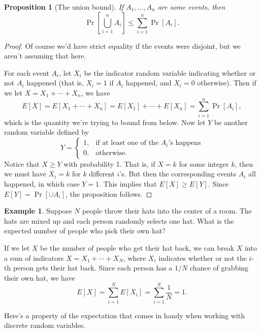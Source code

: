 \documentclass[12pt]{article}
\theoremstyle{plain}
\newtheorem{proposition}[theorem]{Proposition}
\theoremstyle{definition}
\newtheorem{example}[theorem]{Example}
\theoremstyle{remark}
\begin{document}
\begin{proposition}[The union bound]
    If $A_1, \ldots, A_n$ are some events, then
    \[
        \Pr\left[\bigcup_{i=1}^nA_i\right] \leq \sum_{i=1}^n\Pr[A_i].
    \]
\end{proposition}
\begin{proof}
    Of course we'd have strict equality if the events were disjoint, but we aren't assuming that here.

    For each event $A_i$, let $X_i$ be the indicator random variable indicating whether or not $A_i$ happened (that is, $X_i = 1$ if $A_i$ happened, and $X_i = 0$ otherwise).
    Then if we let $X = X_1 + \cdots + X_n$, we have
    \[
        E[X] = E[X_1 + \cdots + X_n] = E[X_1] + \cdots + E[X_n] = \sum_{i=1}^n \Pr[A_i],
    \]
    which is the quantity we're trying to bound from below.
    Now let $Y$ be another random variable defined by
    \[
        Y = \begin{cases}
            1,&\text{if at least one of the $A_i$'s happens}\\
            0,&\text{otherwise.}
        \end{cases}
    \]
    Notice that $X \geq Y$ with probability 1.
    That is, if $X = k$ for some integer $k$, then we must have $X_i = k$ for $k$ different $i$'s.
    But then the corresponding events $A_i$ all happened, in which case $Y = 1$.
    This implies that $E[X]\geq E[Y]$.
    Since $E[Y] = \Pr[\cup A_i]$, the proposition follows.
\end{proof}


\begin{example}
    Suppose $N$ people throw their hats into the center of a room.
    The hats are mixed up and each person randomly selects one hat.
    What is the expected number of people who pick their own hat?

    If we let $X$ be the number of people who get their hat back, we can break $X$ into a sum of indicators $X = X_1 + \cdots + X_N$, where $X_i$ indicates whether or not the $i$-th person gets their hat back.
    Since each person has a $1/N$ chance of grabbing their own hat, we have
    \[
        E[X] = \sum_{i=1}^NE[X_i] = \sum_{i=1}^N \frac{1}{N} = 1.
    \]
\end{example}

Here's a property of the expectation that comes in handy when working with discrete random variables.
\end{document}
